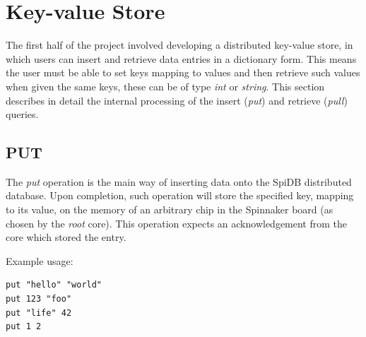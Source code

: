 \section{Key-value Store}
The first half of the project involved developing a distributed key-value store, in which users can insert and retrieve data entries in a dictionary form. This means the user must be able to set keys mapping to values and then retrieve such values when given the same keys, these can be of type \textit{int} or \textit{string}. This section describes in detail the internal processing of the insert (\textit{put}) and retrieve (\textit{pull}) queries. 

\subsection{PUT}
The \textit{put} operation is the main way of inserting data onto the SpiDB distributed database. 
Upon completion, such operation will store the specified key, mapping to its value, on the memory of an arbitrary chip in the Spinnaker board (as chosen by the \textit{root} core). This operation expects an acknowledgement from the core which stored the entry.

Example usage:
\begin{lstlisting}
put "hello" "world"
put 123 "foo"
put "life" 42
put 1 2
\end{lstlisting}
 
